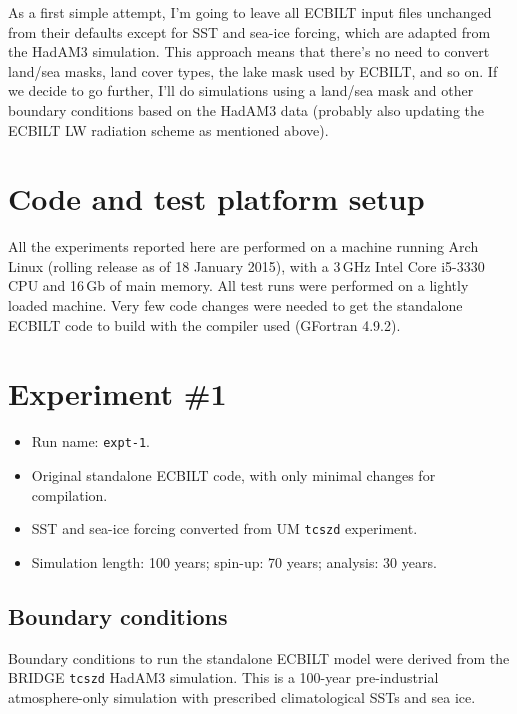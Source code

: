 \documentclass[a4paper,11pt]{article}
\begin{document}
As a first simple attempt, I'm going to leave all ECBILT input files
unchanged from their defaults except for SST and sea-ice forcing,
which are adapted from the HadAM3 simulation.  This approach means
that there's no need to convert land/sea masks, land cover types, the
lake mask used by ECBILT, and so on.  If we decide to go further, I'll
do simulations using a land/sea mask and other boundary conditions
based on the HadAM3 data (probably also updating the ECBILT LW
radiation scheme as mentioned above).


\section{Code and test platform setup}

All the experiments reported here are performed on a machine running
Arch Linux (rolling release as of 18 January 2015), with a 3\,GHz
Intel Core i5-3330 CPU and 16\,Gb of main memory.  All test runs were
performed on a lightly loaded machine.  Very few code changes were
needed to get the standalone ECBILT code to build with the compiler
used (GFortran 4.9.2).


\section{Experiment \#1}

\begin{itemize}
  \item{Run name: \texttt{expt-1}.}
  \item{Original standalone ECBILT code, with only minimal changes for
    compilation.}
  \item{SST and sea-ice forcing converted from UM \texttt{tcszd}
    experiment.}
  \item{Simulation length: 100 years; spin-up: 70 years; analysis: 30
    years.}
\end{itemize}

\subsection{Boundary conditions}

Boundary conditions to run the standalone ECBILT model were derived
from the BRIDGE \texttt{tcszd} HadAM3 simulation.  This is a 100-year
pre-industrial atmosphere-only simulation with prescribed
climatological SSTs and sea ice.
\end{document}
